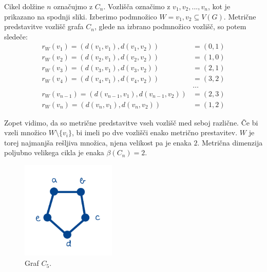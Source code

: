 \documentclass[mat1, tisk]{fmfdelo}
\begin{document}
\begin{primer}\label{primer_2.5.}
    Cikel dolžine $n$ označujmo z $C_n$. Vozlišča označimo z $v_1, v_2, ..., v_n$, kot 
    je prikazano na spodnji sliki. Izberimo podmnožico $W = {v_1, v_2} \subseteq V(G).$ 
    Metrične predstavitve vozlišč grafa $C_n$, glede na izbrano podmnožico vozlišč, so potem sledeče:
    \begin{align*}
        r_W(v_1) = (d(v_1, v_1), d(v_1, v_2)) & = (0, 1) \\
        r_W(v_2) = (d(v_2, v_1), d(v_2, v_2)) & = (1, 0) \\
        r_W(v_3) = (d(v_3, v_1), d(v_3, v_2)) & = (2, 1) \\
        r_W(v_4) = (d(v_4, v_1), d(v_4, v_2)) & = (3, 2) \\
        & \dots \\
        r_W(v_{n-1}) = (d(v_{n-1}, v_1), d(v_{n-1}, v_2)) & = (2, 3) \\
        r_W(v_n) = (d(v_n, v_1), d(v_n, v_2)) & = (1, 2)
    \end{align*}
    
    Zopet vidimo, da so metrične predstavitve vseh vozlišč med seboj različne. Če bi vzeli množico 
    $W \setminus \{v_i\}$, bi imeli po dve vozlišči enako metrično prestavitev.
    $W$  je torej najmanjša rešljiva množica, njena velikost pa je enaka $2$. Metrična dimenzija
    poljubno velikega cikla je enaka $\beta(C_n) = 2.$

    \begin{figure}[h]
        \caption{Graf $C_5$.}
        \centering
        \includegraphics[width=0.4\textwidth]{cikel.jpg}
    \end{figure}
\end{primer}
\end{document}
